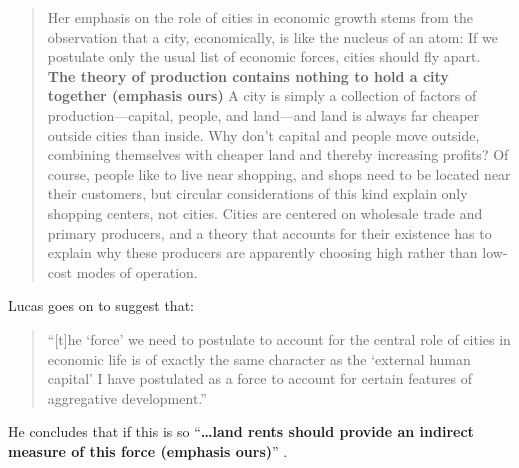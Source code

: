 \begin{quotation}
    \noindent Her emphasis on the role of cities in economic growth stems from the observation that a city, economically, is like the nucleus of an atom: If we postulate only the usual list of economic forces, cities should fly apart. \textbf{The theory of production contains nothing to hold a city together (emphasis ours)} A city is simply a collection of factors of production---capital, people, and land---and land is always far cheaper outside cities than inside. Why don't capital and people move outside, combining themselves with cheaper land and thereby increasing profits? Of course, people like to live near shopping, and shops need to be located near their customers, but circular considerations of this kind explain only shopping centers, not cities. Cities are centered on wholesale trade and primary producers, and a theory that accounts for their existence has to explain why these producers are apparently choosing high rather than low-cost modes of operation. \cite{lucasMechanicsEconomicDevelopment1988}
\end{quotation}


Lucas goes on to suggest that: 
\begin{quotation} 
    \noindent ``[t]he `force' we need to postulate to account for the central role of cities in economic life is of exactly the same character as the `external human capital' I have postulated as a force to account for certain features of aggregative development.''
\end{quotation} 

\noindent He concludes that if this is so ``\textbf{\dots land rents should provide an indirect measure of this force (emphasis ours)}'' %
\cite{lucasMechanicsEconomicDevelopment1988}.  




